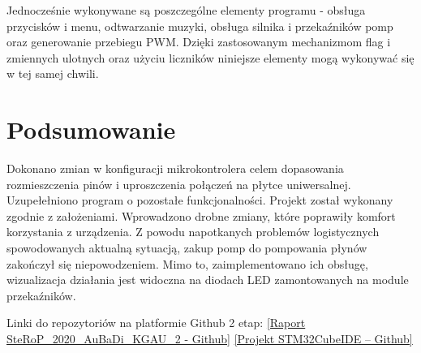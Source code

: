 \documentclass[10pt, a4paper]{article}
\begin{document}
 
Jednocześnie wykonywane są poszczególne elementy programu - obsługa przycisków i menu, odtwarzanie muzyki, obsługa silnika i przekaźników pomp oraz generowanie przebiegu PWM. Dzięki zastosowanym mechanizmom flag i zmiennych ulotnych oraz użyciu liczników niniejsze elementy mogą wykonywać się w tej samej chwili.
 
%
%
%
%



\newpage
\section{Podsumowanie}

Dokonano zmian w konfiguracji mikrokontrolera celem dopasowania rozmieszczenia pinów i uproszczenia połączeń na płytce uniwersalnej. Uzupełełniono program o pozostałe funkcjonalności.
Projekt został wykonany zgodnie z założeniami. Wprowadzono drobne zmiany, które poprawiły komfort korzystania z urządzenia. 
Z powodu napotkanych problemów logistycznych spowodowanych aktualną sytuacją, zakup pomp do pompowania płynów zakończył się niepowodzeniem. Mimo to, zaimplementowano ich obsługę, wizualizacja działania jest widoczna na diodach LED zamontowanych na module przekaźników.


\newpage
\newline
\newline
Linki do repozytoriów na platformie Github 2 etap:
\newline
\href{https://github.com/kewingaluszka/SteRoP_2020_AuBaDi_KGAU_2}{[Raport SteRoP\_2020\_AuBaDi\_KGAU\_2 - Github]}
\newline
\href{https://github.com/kewingaluszka/STM32_AuBaDi}{[Projekt STM32CubeIDE -- Github]}
\end{document}
